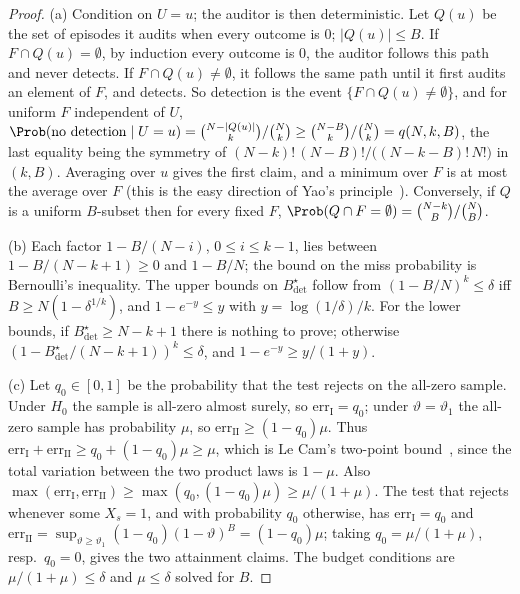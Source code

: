 \begin{proof}
(a) Condition on $U=u$; the auditor is then deterministic. Let $Q(u)$ be the
set of episodes it audits when every outcome is $0$; $|Q(u)|\le B$. If
$F\cap Q(u)=\emptyset$, by induction every outcome is $0$, the auditor follows
this path and never detects. If $F\cap Q(u)\ne\emptyset$, it follows the same
path until it first audits an element of $F$, and detects. So detection is the
event $\{F\cap Q(u)\neq\emptyset\}$, and for uniform $F$ independent of $U$,
$\Prob(\text{no detection}\mid U=u)=\binom{N-|Q(u)|}{k}/\binom Nk\ge
\binom{N-B}{k}/\binom Nk=q(N,k,B)$, the last equality being the symmetry of
$(N-k)!\,(N-B)!/\bigl((N-k-B)!\,N!\bigr)$ in $(k,B)$. Averaging over $u$ gives the first
claim, and a minimum over $F$ is at most the average over $F$ (this is the easy
direction of Yao's principle~\cite{yao1977probabilistic}). Conversely, if $Q$ is
a uniform $B$-subset then for every fixed $F$,
$\Prob(Q\cap F=\emptyset)=\binom{N-k}{B}/\binom NB$.

(b) Each factor $1-B/(N-i)$, $0\le i\le k-1$, lies between $1-B/(N-k+1)\ge0$
and $1-B/N$; the bound on the miss probability is Bernoulli's inequality. The
upper bounds on $B^\star_{\mathrm{det}}$ follow from $(1-B/N)^k\le\delta$ iff
$B\ge N(1-\delta^{1/k})$, and $1-e^{-y}\le y$ with $y=\log(1/\delta)/k$. For the
lower bounds, if $B^\star_{\mathrm{det}}\ge N-k+1$ there is nothing to prove;
otherwise $(1-B^\star_{\mathrm{det}}/(N-k+1))^k\le\delta$, and
$1-e^{-y}\ge y/(1+y)$.

(c) Let $q_0\in[0,1]$ be the probability that the test rejects on the all-zero
sample. Under $H_0$ the sample is all-zero almost surely, so $\mathrm{err}_{\mathrm I}=q_0$; under
$\vartheta=\vartheta_1$ the all-zero sample has probability $\mu$, so
$\mathrm{err}_{\mathrm{II}}\ge(1-q_0)\mu$. Thus $\mathrm{err}_{\mathrm I}+\mathrm{err}_{\mathrm{II}}\ge q_0+(1-q_0)\mu\ge\mu$, which is Le
Cam's two-point bound~\cite{lecam1973convergence,yu1997assouad}, since the total
variation between the two product laws is $1-\mu$. Also
$\max(\mathrm{err}_{\mathrm I},\mathrm{err}_{\mathrm{II}})\ge\max(q_0,(1-q_0)\mu)\ge\mu/(1+\mu)$. The test that rejects
whenever some $X_s=1$, and with probability $q_0$ otherwise, has $\mathrm{err}_{\mathrm I}=q_0$
and $\mathrm{err}_{\mathrm{II}}=\sup_{\vartheta\ge\vartheta_1}(1-q_0)(1-\vartheta)^B=(1-q_0)\mu$;
taking $q_0=\mu/(1+\mu)$, resp.\ $q_0=0$, gives the two attainment claims. The
budget conditions are $\mu/(1+\mu)\le\delta$ and $\mu\le\delta$ solved for $B$.
\end{proof}

